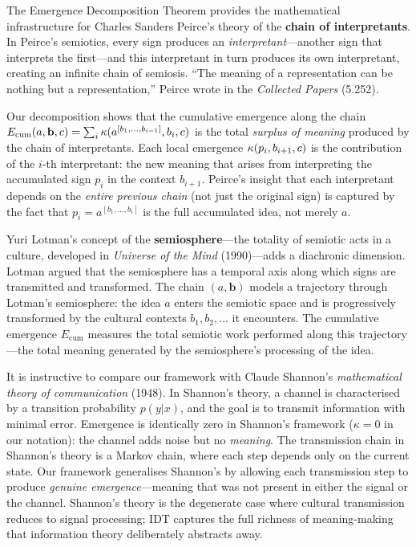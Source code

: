 \begin{interpretation}
\label{interp:ch8:peirce_interpretants}
The Emergence Decomposition Theorem provides the mathematical infrastructure
for Charles Sanders Peirce's theory of the \textbf{chain of interpretants}.
In Peirce's semiotics, every sign produces an \emph{interpretant}---another
sign that interprets the first---and this interpretant in turn produces its
own interpretant, creating an infinite chain of semiosis.  ``The meaning of a
representation can be nothing but a representation,'' Peirce wrote in the
\emph{Collected Papers} (5.252).

Our decomposition shows that the cumulative emergence along the chain
$E_{\mathrm{cum}}(a, \mathbf{b}, c) = \sum_i \kappa(a^{[b_1,\ldots,b_{i-1}]}, b_i, c)$
is the total \emph{surplus of meaning} produced by the chain of
interpretants.  Each local emergence $\kappa(p_i, b_{i+1}, c)$ is the
contribution of the $i$-th interpretant: the new meaning that arises from
interpreting the accumulated sign $p_i$ in the context $b_{i+1}$.  Peirce's
insight that each interpretant depends on the \emph{entire previous chain}
(not just the original sign) is captured by the fact that $p_i = a^{[b_1,\ldots,b_i]}$
is the full accumulated idea, not merely $a$.

Yuri Lotman's concept of the \textbf{semiosphere}---the totality of semiotic
acts in a culture, developed in \emph{Universe of the Mind} (1990)---adds
a diachronic dimension.  Lotman argued that the semiosphere has a temporal
axis along which signs are transmitted and transformed.  The chain
$(a, \mathbf{b})$ models a trajectory through Lotman's semiosphere: the idea
$a$ enters the semiotic space and is progressively transformed by the
cultural contexts $b_1, b_2, \ldots$ it encounters.  The cumulative emergence
$E_{\mathrm{cum}}$ measures the total semiotic work performed along this
trajectory---the total meaning generated by the semiosphere's processing of
the idea.

It is instructive to compare our framework with Claude Shannon's
\emph{mathematical theory of communication} (1948).  In Shannon's theory,
a channel is characterised by a transition probability $p(y|x)$, and the
goal is to transmit information with minimal error.  Emergence is identically
zero in Shannon's framework ($\kappa = 0$ in our notation): the channel adds
noise but no \emph{meaning}.  The transmission chain in Shannon's theory is
a Markov chain, where each step depends only on the current state.  Our
framework generalises Shannon's by allowing each transmission step to produce
\emph{genuine emergence}---meaning that was not present in either the signal
or the channel.  Shannon's theory is the degenerate case where cultural
transmission reduces to signal processing; IDT captures the full richness of
meaning-making that information theory deliberately abstracts away.
\end{interpretation}



